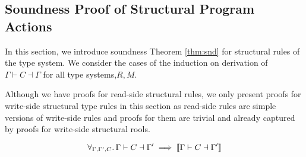 \subsection{Soundness Proof of Structural Program Actions}
\label{lem:lemstructural}
In this section, we introduce soundness Theorem \ref{thm:snd} for structural rules of the type system. We consider the cases of the induction on derivation of  $\Gamma \vdash C \dashv \Gamma$ for all type systems,$R,M$.

Although we have proofs for read-side structural rules, we only present proofs for write-side structural type rules in this section as read-side rules are simple versions of write-side rules and proofs for them are trivial and already captured by proofs for write-side structural rools.
\begin{theorem}
  \label{thm:snd}
\[
\forall_{\Gamma,\Gamma',C}\ldotp \Gamma \vdash C \dashv \Gamma' \implies \llbracket \Gamma \vdash C \dashv \Gamma' \rrbracket 
\]
\end{theorem}

